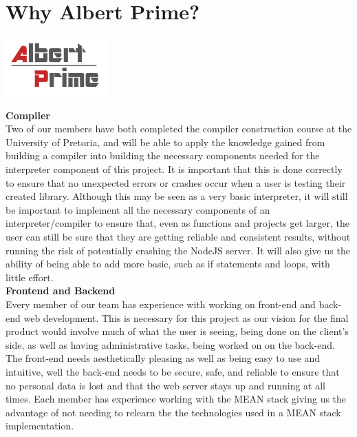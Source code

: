 \documentclass[12pt]{article}
\begin{document}
	\section{Why Albert Prime?}
	\begin{center}
    	\includegraphics[width=4cm]{../Common/AlbertPrimeLogo.png}
	\end{center}
	\textbf{Compiler}\\
    Two of our members have both completed the compiler construction course at the University of Pretoria, and will be able to apply 
    the knowledge gained from building a compiler into building the necessary components needed for the interpreter component of this project. 
    It is important that this is done correctly to ensure that no unexpected errors or crashes occur when a user is testing their 
    created library. Although this may be seen as a very basic interpreter, it will still be important to implement all the necessary 
    components of an interpreter/compiler to ensure that, even as functions and projects get larger, the user can still be sure that they are
    getting reliable and consistent results, without running the risk of potentially crashing the NodeJS server. It will also give us the 
    ability of being able to add more basic, such as if statements and loops, with little effort.\\
    
	\textbf{Frontend and Backend}\\
    Every member of our team has experience with working on front-end and back-end web development. This is necessary for this project 
    as our vision for the final product would involve much of what the user is seeing, being done on the client's side, as well as having
    administrative tasks, being worked on on the back-end. The front-end needs aesthetically pleasing as well as being easy to use and intuitive,
    well the back-end needs to be secure, safe, and reliable to ensure that no personal data is lost and that the web server stays up 
    and running at all times. Each member has experience working with the MEAN stack giving us the advantage of not needing to relearn the
    the technologies used in a MEAN stack implementation.\par
\end{document}
